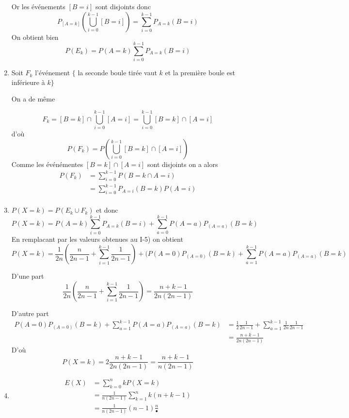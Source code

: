 \documentclass[a4paper, 11pt,reqno]{article}
\begin{document}
\begin{correction}
\begin{enumerate}
Or les événements $[B=i]$ sont disjoints donc 
$$ P_{[A=k] }( \bigcup_{i=0}^{k-1} [B=i]) = \sum_{i=0}^{k-1}   P_{A=k }( B=i)$$
On obtient bien 
$$P(E_k)  =P(A=k)  \sum_{i=0}^{k-1}   P_{A=k }( B=i)$$

\item Soit $F_k $ l'événement $\{$ la seconde boule tirée vaut $k$ et la première boule est inférieure à $k\}$

On a de même 

$$F_k = [B=k] \cap \bigcup_{i=0}^{k-1} [A=i] = \bigcup_{i=0}^{k-1} [B=k] \cap [A=i]$$
d'où 
$$P(F_k) = P(\bigcup_{i=0}^{k-1} [B=k] \cap [A=i])$$
Comme les événémentes  $[B=k] \cap [A=i]$ sont disjoints on a alors 
\begin{align*}
P(F_k)&= \sum_{i=0}^{k-1} P(B=k \cap A=i)\\
		&=  \sum_{i=0}^{k-1} P_{A=i}(B=k)P ( A=i)\\
\end{align*}
\item 
$P(X=k) = P(E_k \cup F_k)$ et donc 
$$P(X=k) = P(A=k)\sum_{i=0}^{k-1} P_{A=k}(B=i)  + \sum_{a=0}^{k-1} P(A=a) P_{(A=a)}(B=k) $$
En remplacant par les valeurs obtenues au I-5) on obtient 
$$P(X=k) = \frac{1}{2n} \left(\frac{n}{2n-1}+ \sum_{i=1}^{k-1}   \frac{1}{2n-1}\right) + ( P(A=0) P_{(A=0)}(B=k)  +\sum_{a=1 }^{k-1}   P(A=a) P_{(A=a)}(B=k) $$

D'une part 
$$\frac{1}{2n} \left(\frac{n}{2n-1}+ \sum_{i=1}^{k-1}   \frac{1}{2n-1}\right)= \frac{n+k-1}{2n(2n-1)}$$

D'autre part 
\begin{align*}
 P(A=0) P_{(A=0)}(B=k)  +\sum_{a=1 }^{k-1}   P(A=a) P_{(A=a)}(B=k)  & = \frac{1}{2}\frac{1}{2n-1} + \sum_{a=1 }^{k-1} \frac{1}{2n} \frac{1}{2n-1}\\
 &= \frac{n+k-1}{2n(2n-1)}
\end{align*}
D'où 
$$P(X=k) = 2  \frac{n+k-1}{2n(2n-1)}=  \frac{n+k-1}{n(2n-1)}$$


\item 

\begin{align*}
E(X) &= \sum_{k=0}^n kP(X=k)\\
		&=\frac{1}{n(2n-1)} \sum_{k=1}^n k(n+k-1)\\
		&= \frac{1}{n(2n-1)} (n-1) \frac{n}{•}
\end{align*}

\end{enumerate}

\end{correction}
\newpage
\end{document}
